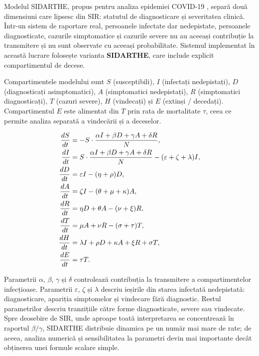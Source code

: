 Modelul SIDARTHE, propus pentru analiza epidemiei COVID-19
\cite{giordano2020sidarthe}, separă două dimensiuni care lipsesc din SIR:
statutul de diagnosticare și severitatea clinică. Într-un sistem de raportare
real, persoanele infectate dar nedepistate, persoanele diagnosticate, cazurile
simptomatice și cazurile severe nu au aceeași contribuție la transmitere și nu
sunt observate cu aceeași probabilitate. Sistemul implementat în această lucrare
folosește varianta \textbf{SIDARTHE}, care include explicit compartimentul de
decese.

Compartimentele modelului sunt $S$ (susceptibili), $I$ (infectați nedepistați),
$D$ (diagnosticați asimptomatici), $A$ (simptomatici nedepistați), $R$
(simptomatici diagnosticați), $T$ (cazuri severe), $H$ (vindecați) și $E$
(extinși / decedați). Compartimentul $E$ este alimentat din $T$ prin rata de
mortalitate $\tau$, ceea ce permite analiza separată a vindecării și a deceselor.

\begin{align}
\frac{dS}{dt} &= - S \cdot \frac{\alpha I + \beta D + \gamma A + \delta R}{N}, \\
\frac{dI}{dt} &= S \cdot \frac{\alpha I + \beta D + \gamma A + \delta R}{N}
              - (\varepsilon + \zeta + \lambda) I, \\
\frac{dD}{dt} &= \varepsilon I - (\eta + \rho)D, \\
\frac{dA}{dt} &= \zeta I - (\theta + \mu + \kappa)A, \\
\frac{dR}{dt} &= \eta D + \theta A - (\nu + \xi)R, \\
\frac{dT}{dt} &= \mu A + \nu R - (\sigma + \tau)T, \\
\frac{dH}{dt} &= \lambda I + \rho D + \kappa A + \xi R + \sigma T, \\
\frac{dE}{dt} &= \tau T.
\label{eq:sidarthe}
\end{align}

Parametrii $\alpha$, $\beta$, $\gamma$ și $\delta$ controlează contribuția la
transmitere a compartimentelor infecțioase. Parametrii $\varepsilon$, $\zeta$ și
$\lambda$ descriu ieșirile din starea infectată nedepistată: diagnosticare,
apariția simptomelor și vindecare fără diagnostic. Restul parametrilor descriu
tranzițiile către forme diagnosticate, severe sau vindecate. Spre deosebire de
SIR, unde aproape toată interpretarea se concentrează în raportul
$\beta/\gamma$, SIDARTHE distribuie dinamica pe un număr mai mare de rate; de
aceea, analiza numerică și sensibilitatea la parametri devin mai importante decât
obținerea unei formule scalare simple.

